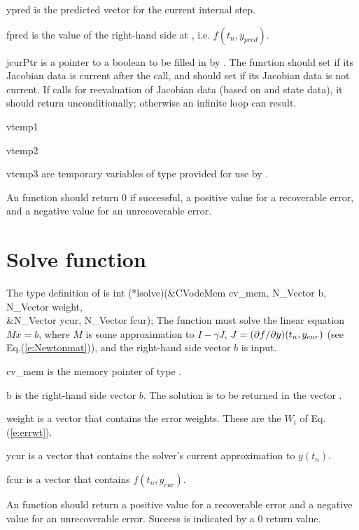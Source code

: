 {\begin{args}[convfail]
   \item[ypred]
     is the predicted  vector for the current {\cvodes} internal step.
  
   \item[fpred]
     is the value of the right-hand side at , i.e. $f(t_n, y_{pred})$.
  
   \item[jcurPtr]
     is a pointer to a boolean to be filled in by .  
     The function should set  if its Jacobian 
     data is current after the call, and should set         
      if its Jacobian data is not current.   
     If  calls for reevaluation of         
     Jacobian data (based on  and {\cvodes} state      
     data), it should return  unconditionally;
     otherwise an infinite loop can result.                
    
   \item[vtemp1] 
   \item[vtemp2]
   \item[vtemp3] 
     are temporary variables of type  provided for use by .      
  
   \end{args}
}
{
  An  function should return $0$ if successful,            
  a positive value for a recoverable error, and a negative value  
  for an unrecoverable error.  
}
{}


\section{Solve function}
The type definition of  is
{
  int (*lsolve)(&CVodeMem cv\_mem, N\_Vector b, N\_Vector weight, \\
                &N\_Vector ycur, N\_Vector fcur);  
}
{
  The function  must solve the linear equation $M x = b$, where         
  $M$ is some approximation to $I - \gamma J$, $J = (\partial f / \partial y)(t_n, y_{cur})$
  (see Eq.(\ref{e:Newtonmat})), and the right-hand side vector $b$ is input. 
}
{
  \begin{args}[cv\_mem]
  \item[cv\_mem]
    is the {\cvodes} memory pointer of type .
  \item[b]
    is the right-hand side vector $b$. The solution is to be    
    returned in the vector .
  \item[weight]
    is a vector that contains the error weights.
    These are the $W_i$ of Eq.(\ref{e:errwt}).
  \item[ycur]
    is a vector that contains the solver's current approximation to $y(t_n)$.
  \item[fcur]
    is a vector that contains $f(t_n,y_{cur})$. 
  \end{args}
}
{
  An  function should return a positive value    
  for a recoverable error and a negative value for an             
  unrecoverable error. Success is indicated by a $0$ return value.
}
{}

